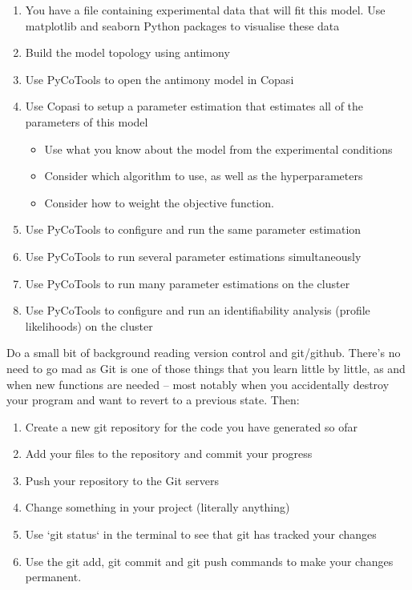 \documentclass[11pt]{article}
\begin{document}
    \begin{enumerate}
        \item You have a file containing experimental data that will fit this model. Use matplotlib and seaborn Python packages to visualise these data
        \item Build the model topology using antimony
        \item Use PyCoTools to open the antimony model in Copasi
        \item Use Copasi to setup a parameter estimation that estimates all of the parameters of this model
        \begin{itemize}
            \item Use what you know about the model from the experimental conditions
            \item Consider which algorithm to use, as well as the hyperparameters
            \item Consider how to weight the objective function.
        \end{itemize}
        \item Use PyCoTools to configure and run the same parameter estimation
        \item Use PyCoTools to run several parameter estimations simultaneously
        \item Use PyCoTools to run many parameter estimations on the cluster
        \item Use PyCoTools to configure and run an identifiability analysis (profile likelihoods) on the cluster
    \end{enumerate}

    Do a small bit of background reading version control and git/github. There's no need to go mad
    as Git is one of those things that you learn little by little, as and when new functions are needed -- most notably
    when you accidentally destroy your program and want to revert to a previous state. Then:

    \begin{enumerate}
        \item Create a new git repository for the code you have generated so ofar
        \item Add your files to the repository and commit your progress
        \item Push your repository to the Git servers
        \item Change something in your project (literally anything)
        \item Use `git status` in the terminal to see that git has tracked your changes
        \item Use the git add, git commit and git push commands to make your changes permanent.
    \end{enumerate}
\end{document}
